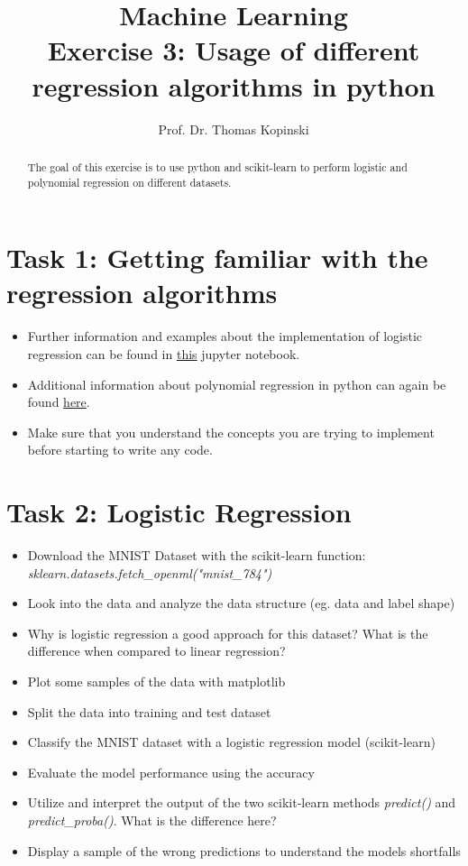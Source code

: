 \documentclass{article}
\title{Machine Learning \\ Exercise 3: Usage of different regression algorithms in python}
\author{Prof. Dr. Thomas Kopinski}
\begin{document}
\maketitle

\begin{abstract}
The goal of this exercise is to use python and scikit-learn to perform logistic and polynomial regression on different datasets.
\end{abstract}

\section*{Task 1: Getting familiar with the regression algorithms}

\begin{itemize}
    \item Further information and examples about the implementation of logistic regression can be found in  \href{https://github.com/rasbt/machine-learning-book/blob/main/ch03/ch03.ipynb}{this} jupyter notebook.
    \item Additional information about polynomial regression in python can again be found \href{https://github.com/DataScienceLabFHSWF/machine-learning-book/blob/main/notebooks/ch09/ch09.ipynb}{here}.
    \item Make sure that you understand the concepts you are trying to implement before starting to write any code.
\end{itemize}

\section*{Task 2: Logistic Regression}

\begin{itemize}
   \item Download the MNIST Dataset with the scikit-learn function: \\ \emph{sklearn.datasets.fetch\_openml("mnist\_784")}
   \item Look into the data and analyze the data structure (eg. data and label shape)
   \item Why is logistic regression a good approach for this dataset? What is the difference when compared to linear regression?
   \item Plot some samples of the data with matplotlib
   \item Split the data into training and test dataset
   \item Classify the MNIST dataset with a logistic regression model (scikit-learn)
   \item Evaluate the model performance using the accuracy
   \item Utilize and interpret the output of the two scikit-learn methods \emph{predict()} and \emph{predict\_proba()}. What is the difference here?
   \item Display a sample of the wrong predictions to understand the models shortfalls
\end{itemize}
\end{document}
